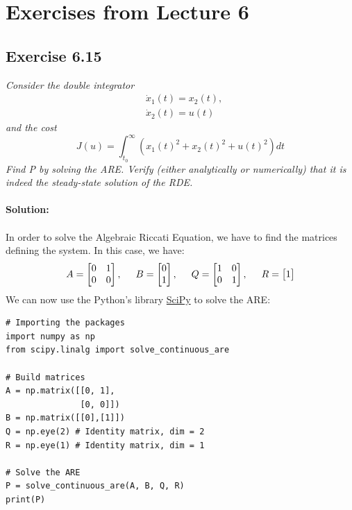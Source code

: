 \section{Exercises from Lecture 6}

\subsection{Exercise 6.15}
\emph{Consider the double integrator}
\begin{align}
    &\Dot{x}_1(t) = x_2(t), \\
    &\Dot{x}_2(t) = u(t)
\end{align}
\emph{and the cost}
\begin{equation}
    J(u) = \int_{t_0}^\infty \left( x_1(t)^2 + x_2(t)^2 + u(t) ^2 \right) dt
\end{equation}
\emph{Find P by solving the ARE. Verify (either analytically or numerically) that it is indeed the steady-state solution of the RDE.}
\\
\\
\textbf{Solution:}\\
\\
In order to solve the Algebraic Riccati Equation, we have to find the matrices defining the system. In this case, we have:
\begin{equation}
    A = \begin{bmatrix}
         0 & 1 \\
         0 & 0 \\
    \end{bmatrix}
    ,\hspace{0.5cm} B=
    \begin{bmatrix}
         0 \\
         1 \\
    \end{bmatrix}
    , \hspace{0.5cm} Q =
    \begin{bmatrix}
         1 & 0\\
         0 & 1\\
    \end{bmatrix}
    , \hspace{0.5cm} R =
    \begin{bmatrix}
         1 \\
    \end{bmatrix}
\end{equation}
We can now use the Python's library \href{https://www.scipy.org/}{SciPy} to solve the ARE:

\begin{verbatim}
# Importing the packages
import numpy as np
from scipy.linalg import solve_continuous_are

# Build matrices
A = np.matrix([[0, 1],
               [0, 0]])
B = np.matrix([[0],[1]])
Q = np.eye(2) # Identity matrix, dim = 2
R = np.eye(1) # Identity matrix, dim = 1

# Solve the ARE
P = solve_continuous_are(A, B, Q, R)
print(P)
\end{verbatim}

